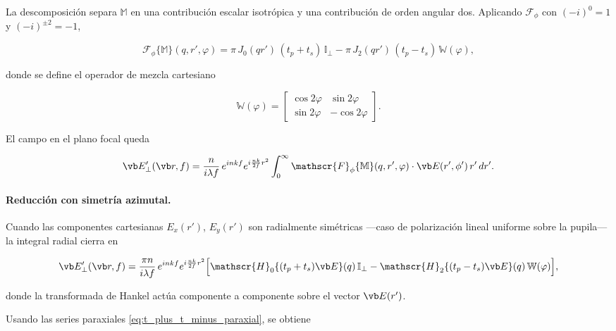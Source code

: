 La descomposición separa $\mathbb{M}$ en una contribución escalar isotrópica y una contribución de orden angular dos. Aplicando $\mathscr{F}_\phi$ con $(-i)^0 = 1$ y $(-i)^{\pm 2} = -1$,

\begin{equation}
  \mathscr{F}_\phi\{\mathbb{M}\}(q, r', \varphi)
  =
  \pi\,J_0(qr')\,(t_p+t_s)\,\mathbb{I}_\perp
  -
  \pi\,J_2(qr')\,(t_p-t_s)\,\mathbb{W}(\varphi),
  \label{eq:Fphi_M_cartesian}
\end{equation}

donde se define el operador de mezcla cartesiano

\begin{equation}
  \mathbb{W}(\varphi)
  =
  \begin{bmatrix}
    \cos 2\varphi & \sin 2\varphi \\
    \sin 2\varphi & -\cos 2\varphi
  \end{bmatrix}.
  \label{eq:def_W_mixing}
\end{equation}

El campo en el plano focal queda

\begin{equation}
  \vb E'_\perp(\vb r, f)
  =
  \frac{n}{i\lambda f}\,e^{inkf}e^{i\frac{nk}{2f}r^2}
  \int_0^\infty
  \mathscr{F}_\phi\{\mathbb{M}\}(q, r', \varphi)
  \cdot
  \vb E(r', \phi')\,r'\,dr'.
  \label{eq:E_field_general_cartesian}
\end{equation}

\paragraph{Reducción con simetría azimutal.}
Cuando las componentes cartesianas $E_x(r')$, $E_y(r')$ son radialmente simétricas —caso de polarización lineal uniforme sobre la pupila— la integral radial cierra en

\begin{equation}
  \vb E'_\perp(\vb r, f)
  =
  \frac{\pi n}{i\lambda f}\,e^{inkf}e^{i\frac{nk}{2f}r^2}
  \Big[
    \mathscr{H}_0\{(t_p+t_s)\vb E\}(q)\,\mathbb{I}_\perp
    -
    \mathscr{H}_2\{(t_p-t_s)\vb E\}(q)\,\mathbb{W}(\varphi)
  \Big],
  \label{eq:E_field_cartesian_azimuthal}
\end{equation}

donde la transformada de Hankel actúa componente a componente sobre el vector $\vb E(r')$.

Usando las series paraxiales \eqref{eq:t_plus_t_minus_paraxial}, se obtiene

